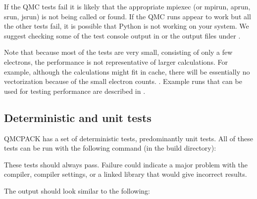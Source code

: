 \documentclass[letterpaper,10pt,english]{sphinxmanual}
\begin{document}
If  the QMC tests fail it is likely
that the appropriate mpiexec (or mpirun, aprun, srun, jsrun) is not being
called or found. If the QMC runs appear to work but all the other
tests fail, it is possible that Python is not working on your system. We suggest checking some of the test console output in 
or the output files under .

Note that because most of the tests are very small, consisting of only a few
electrons, the performance is not representative of larger
calculations. For example, although the calculations might fit in cache,
there will be essentially no vectorization because of the small electron
counts. . Example runs that can be used for testing performance are described in
{\hyperref[\detokenize{installation:perftests}]{}}.


\subsection{Deterministic and unit tests}
\label{\detokenize{installation:deterministic-and-unit-tests}}
QMCPACK has a set of deterministic tests, predominantly unit tests.
All of these tests can be run with the following command (in the build directory):

\begin{sphinxVerbatim}[commandchars=\\\{\}]
    
\end{sphinxVerbatim}

These tests should always pass. Failure could indicate a major problem
with the compiler, compiler settings, or a linked library that would
give incorrect results.

The output should look similar to the following:
\end{document}
